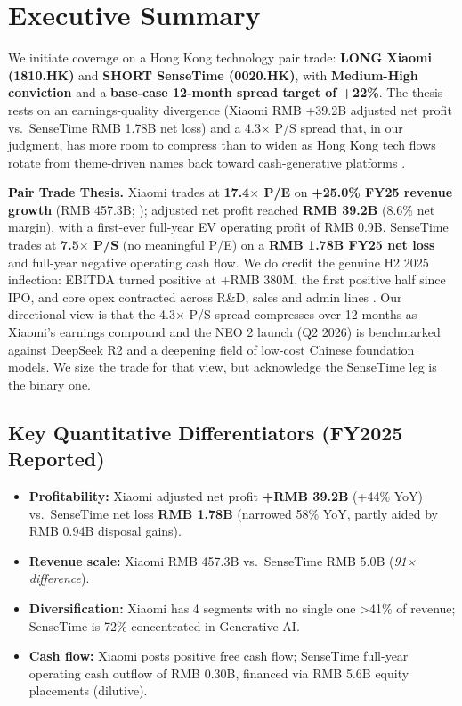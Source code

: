 \documentclass[11pt,a4paper]{article}
\begin{document}
\newpage


\section{Executive Summary}

We initiate coverage on a Hong Kong technology pair trade: \textbf{LONG Xiaomi (1810.HK)} and \textbf{SHORT SenseTime (0020.HK)}, with \textbf{Medium-High conviction} and a \textbf{base-case 12-month spread target of +22\%}. The thesis rests on an earnings-quality divergence (Xiaomi RMB +39.2B adjusted net profit vs.\ SenseTime RMB \textminus 1.78B net loss) and a 4.3$\times$ P/S spread that, in our judgment, has more room to compress than to widen as Hong Kong tech flows rotate from theme-driven names back toward cash-generative platforms \cite{gatev2006pairs}.

\begin{thesisbox}
\textbf{Pair Trade Thesis.} Xiaomi trades at \textbf{17.4$\times$ P/E} on \textbf{+25.0\% FY25 revenue growth} (RMB 457.3B; \cite{xiaomi2025ar}); adjusted net profit reached \textbf{RMB 39.2B} (8.6\% net margin), with a first-ever full-year EV operating profit of RMB 0.9B. SenseTime trades at \textbf{7.5$\times$ P/S} (no meaningful P/E) on a \textbf{RMB 1.78B FY25 net loss} and full-year negative operating cash flow. We do credit the genuine H2 2025 inflection: EBITDA turned positive at +RMB 380M, the first positive half since IPO, and core opex contracted across R\&D, sales and admin lines \cite{sensetime2025ar}. Our directional view is that the 4.3$\times$ P/S spread compresses over 12 months as Xiaomi's earnings compound and the NEO 2 launch (Q2 2026) is benchmarked against DeepSeek R2 and a deepening field of low-cost Chinese foundation models. We size the trade for that view, but acknowledge the SenseTime leg is the binary one.
\end{thesisbox}

\subsection*{Key Quantitative Differentiators (FY2025 Reported)}
\begin{itemize}
\item \textbf{Profitability:} Xiaomi adjusted net profit \textbf{+RMB 39.2B} (+44\% YoY) vs.\ SenseTime net loss \textbf{\textminus RMB 1.78B} (narrowed 58\% YoY, partly aided by RMB 0.94B disposal gains).
\item \textbf{Revenue scale:} Xiaomi RMB 457.3B vs.\ SenseTime RMB 5.0B (\textit{91× difference}).
\item \textbf{Diversification:} Xiaomi has 4 segments with no single one >41\% of revenue; SenseTime is 72\% concentrated in Generative AI.
\item \textbf{Cash flow:} Xiaomi posts positive free cash flow; SenseTime full-year operating cash outflow of \textminus RMB 0.30B, financed via RMB 5.6B equity placements (dilutive).
\end{itemize}
\end{document}
